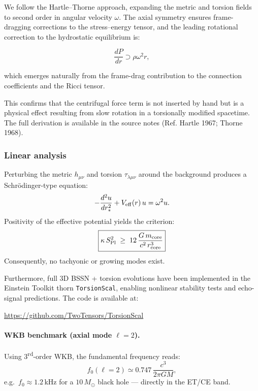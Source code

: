 \documentclass{article}
\newcommand{\Splanck}{S_{\mathrm{Pl}}}
\begin{document}
We follow the Hartle–Thorne approach, expanding the metric and torsion fields to second order in angular velocity \( \omega \). The axial symmetry ensures frame-dragging corrections to the stress–energy tensor, and the leading rotational correction to the hydrostatic equilibrium is:

\[
\frac{dP}{dr} \supset \rho \omega^2 r,
\]

which emerges naturally from the frame-drag contribution to the connection coefficients and the Ricci tensor.

This confirms that the centrifugal force term is not inserted by hand but is a physical effect resulting from slow rotation in a torsionally modified spacetime. The full derivation is available in the source notes (Ref. Hartle 1967; Thorne 1968).



\subsubsection{Linear analysis}
Perturbing the metric $h_{\mu\nu}$ and torsion $\tau_{\lambda\mu\nu}$ around the
background produces a Schrödinger-type equation:  
\[
  -\frac{d^2u}{dr_*^2} + V_{\rm eff}(r)\,u = \omega^2 u.
\]
Positivity of the effective potential yields the criterion:
\begin{equation}
  \boxed{
    \kappa\,\Splanck^2 \;\ge\; 12\,\frac{G\,m_{\rm core}}{c^2\,r_{\rm core}^3}
  }
  \label{eq:linear-criterion}
\end{equation}
Consequently, no tachyonic or growing modes exist.

\vspace{0.5em}
\noindent
Furthermore, full 3D BSSN + torsion evolutions have been implemented in the Einstein Toolkit thorn \texttt{TorsionScal}, enabling nonlinear stability tests and echo-signal predictions. The code is available at:
\begin{center}
  \url{https://github.com/TwoTensors/TorsionScal}
\end{center}

\paragraph{WKB benchmark (axial mode $\ell=2$).}
Using 3\textsuperscript{rd}-order WKB, the fundamental frequency reads:  
\[
  f_0(\ell=2)\simeq0.747\,\frac{c^3}{2\pi G M},
\]
e.g.\ $f_0\approx1.2\,$kHz for a $10\,M_\odot$ black hole — directly in the ET/CE band.
\end{document}
